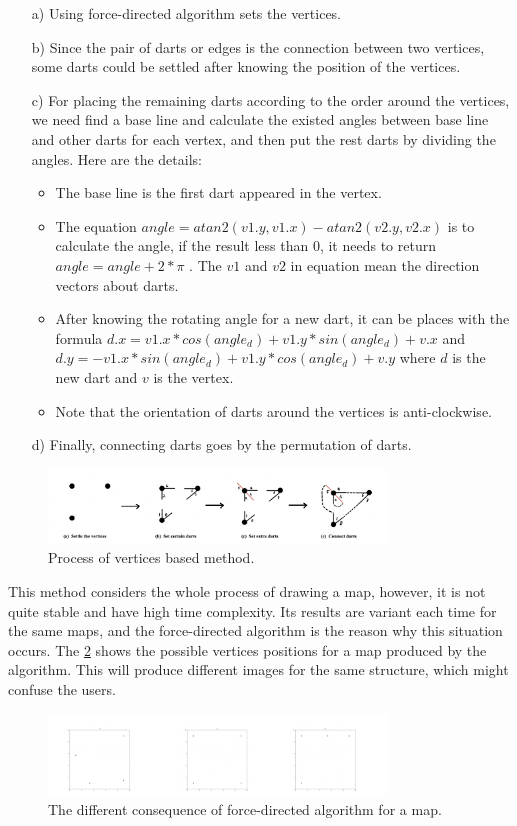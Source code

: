 \begin{itemize}
    \item[a)] Using force-directed algorithm sets the vertices.
    \item[b)] Since the pair of darts or edges is the connection between two vertices, some darts could be settled after knowing the position of the vertices.
    \item[c)] For placing the remaining darts according to the order around the vertices, we need find a base line and calculate the existed angles between base line and other darts for each vertex, and then put the rest darts by dividing the angles. Here are the details:
    \begin{itemize} 
        \item The base line is the first dart appeared in the vertex.
        \item The equation \(angle=atan2(v1.y,v1.x)-atan2(v2.y,v2.x)\) is to calculate the angle, if the result less than 0, it needs to return \(angle=angle+2*\pi\) . The \(v1\) and \(v2\) in equation mean the direction vectors about darts.
        \item After knowing the rotating angle for a new dart, it can be places with the formula \(d.x=v1.x*cos(angle_d)+v1.y*sin(angle_d)+v.x\) and \(d.y=-v1.x*sin(angle_d)+v1.y*cos(angle_d)+v.y\) where \(d\) is the new dart and \(v\) is the vertex.
        \item Note that the orientation of darts around the vertices is anti-clockwise.
    \end{itemize}
    \item[d)] Finally, connecting darts goes by the permutation of darts. 
\end{itemize}

\begin{figure}[htb]
    \centering
    \includegraphics[width=0.8\textwidth]{../../image/firstmethod.png}
    \caption{Process of vertices based method.}
    \label{fig:figures:firstmethod}
  \end{figure}

\newpage
This method considers the whole process of drawing a map, however, it is not quite stable and have high time complexity. Its results are variant each time for the same maps, and the force-directed algorithm is the reason why this situation occurs. The \cref{fig:figures:frvertices} shows the possible vertices positions for a map produced by the algorithm. This will produce different images for the same structure, which might confuse the users.

\begin{figure}[htb]
    \centering
    \includegraphics[width=0.8\textwidth]{../../image/frvertices.png}
    \caption{The different consequence of force-directed algorithm for a map.}
    \label{fig:figures:frvertices}
  \end{figure}